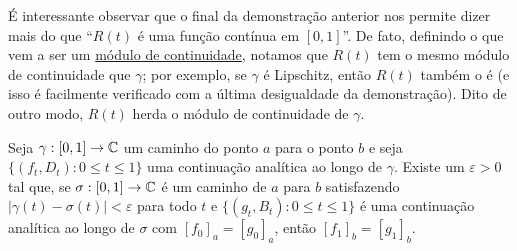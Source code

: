 É interessante observar que o final da demonstração anterior nos permite dizer
mais do que ``$R(t)$ é uma função contínua em $[0,1]$''. De fato, definindo o que
vem a ser um 
\href{https://en.wikipedia.org/wiki/Modulus_of_continuity}{módulo de continuidade},
notamos que $R(t)$ tem o mesmo módulo de continuidade que $\gamma$; por exemplo, se
$\gamma$ é Lipschitz, então $R(t)$ também o é 
(e isso é facilmente verificado com a última desigualdade da demonstração).
Dito de outro modo, $R(t)$ herda o módulo de continuidade de $\gamma$.

    \begin{lema}
    \label{lema-ext-epsilon-proximas}
        Seja $\gamma: [0,1] \to \mathbb{C}$ um caminho do ponto $a$ para o ponto $b$ e seja
        $\{(f_t, D_t): 0 \leq t \leq 1\}$ uma continuação analítica ao longo de $\gamma$. 
        Existe um $\varepsilon > 0$ tal que, se $\sigma :[0,1] \to \mathbb{C}$ é um caminho 
        de $a$ para $b$ satisfazendo $|\gamma(t) - \sigma(t)| < \varepsilon$ para todo $t$ 
        e $\{(g_t, B_t): 0 \leq t \leq 1\}$ é uma continuação analítica ao longo de $\sigma$ 
        com $[f_0]_a = [g_0]_a$, então $[f_1]_b = [g_1]_b$.
    \end{lema}

